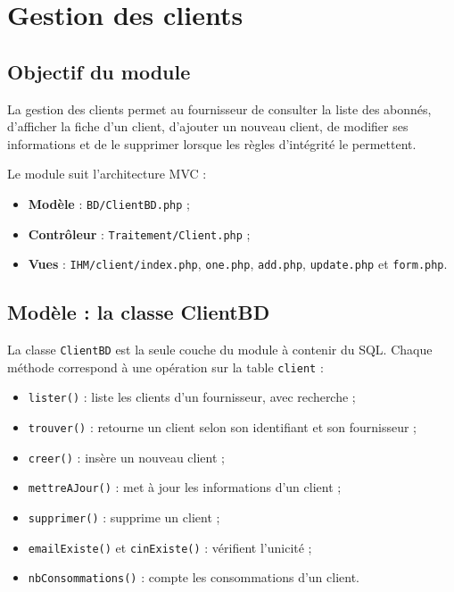 \section{Gestion des clients}

\subsection{Objectif du module}

La gestion des clients permet au fournisseur de consulter la liste des abonnés, d'afficher la fiche d'un client, d'ajouter un nouveau client, de modifier ses informations et de le supprimer lorsque les règles d'intégrité le permettent.

Le module suit l'architecture MVC :

\begin{itemize}[leftmargin=*]
  \item \textbf{Modèle} : \texttt{BD/ClientBD.php} ;
  \item \textbf{Contrôleur} : \texttt{Traitement/Client.php} ;
  \item \textbf{Vues} : \texttt{IHM/client/index.php}, \texttt{one.php}, \texttt{add.php}, \texttt{update.php} et \texttt{form.php}.
\end{itemize}

\subsection{Modèle : la classe ClientBD}

La classe \texttt{ClientBD} est la seule couche du module à contenir du SQL. Chaque méthode correspond à une opération sur la table \texttt{client} :

\begin{itemize}[leftmargin=*]
  \item \texttt{lister()} : liste les clients d'un fournisseur, avec recherche ;
  \item \texttt{trouver()} : retourne un client selon son identifiant et son fournisseur ;
  \item \texttt{creer()} : insère un nouveau client ;
  \item \texttt{mettreAJour()} : met à jour les informations d'un client ;
  \item \texttt{supprimer()} : supprime un client ;
  \item \texttt{emailExiste()} et \texttt{cinExiste()} : vérifient l'unicité ;
  \item \texttt{nbConsommations()} : compte les consommations d'un client.
\end{itemize}

